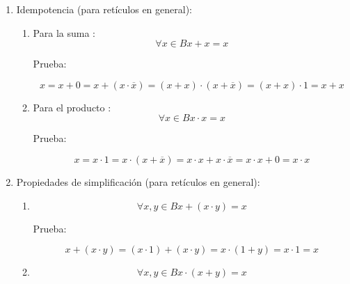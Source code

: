 \documentclass[
]{article}
\begin{document}
\begin{enumerate}
\begin{enumerate}
\begin{enumerate}
\begin{enumerate}
        Prueba:

        \[\forall{x \in B}{x + 0}{=}x\]

        \[\forall{x \in B}{\exists\mathtt{\mathrm{!}}}{\overline{x} \in B}{{{\overline{x} \cdot {({x + 0})}} = {\overline{x} \cdot x}} = 0}\]

        \[\forall{x \in B}{\exists\mathtt{\mathrm{!}}}{\overline{x} \in B}{{{0 = {\overline{x} \cdot {({x + 1})}}} = {{({\overline{x} \cdot x})} + {({\overline{x} \cdot 0})}}} = {\overline{x} \cdot 0}}\]

        \[\forall{x \in B}{\exists\mathtt{\mathrm{!}}}{\overline{x} \in B}{0 = {\overline{x} \cdot 0}}\]

        \[\forall{x \in B}{\exists\mathtt{\mathrm{!}}}{\overline{x} \in B}{\exists\mathtt{\mathrm{!}}}{\overline{\overline{x}} \in B}{0 = {\overline{x} \cdot 0}} \land {0 = {\overline{\overline{x}} \cdot 0}}\]

        \[\forall{x \in B}{0 = {x \cdot 0}}\]
      \end{enumerate}
    \item
      Idempotencia (para retículos en general):

      \begin{enumerate}
      \def\labelenumiv{\arabic{enumiv}.}
      \item
        Para la suma :\[\forall{x \in B}{{x + x} = x}\]

        Prueba:

        \[{{{{x = {x + 0}} = {x + {({x \cdot \overline{x}})}}} = {{({x + x})} \cdot {({x + \overline{x}})}}} = {{({x + x})} \cdot 1}} = {x + x}\]
      \item
        Para el producto : \[\forall{x \in B}{{x \cdot x} = x}\]

        Prueba:

        \[{{{{x = {x \cdot 1}} = {x \cdot {({x + \overline{x}})}}} = {{x \cdot x} + {x \cdot \overline{x}}}} = {{x \cdot x} + 0}} = {x \cdot x}\]
      \end{enumerate}
    \item
      Propiedades de simplificación (para retículos en general):

      \begin{enumerate}
      \def\labelenumiv{\arabic{enumiv}.}
      \item
        \[\forall x,{y \in B}{{x + {({x \cdot y})}} = x}\]

        Prueba:

        \[{{{{x + {({x \cdot y})}} = {{({x \cdot 1})} + {({x \cdot y})}}} = {x \cdot {({1 + y})}}} = {x \cdot 1}} = x\]
      \item
        \[\forall x,{y \in B}{{x \cdot {({x + y})}} = x}\]


\end{enumerate}
\end{enumerate}
\end{enumerate}
\end{enumerate}
\end{document}
